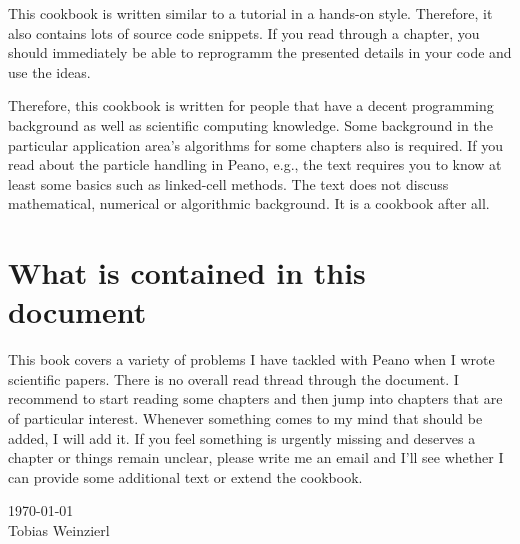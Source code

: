This cookbook is written similar to a tutorial in a hands-on style.
Therefore, it also contains lots of source code snippets.
If you read through a chapter, you should immediately be able to reprogramm the
presented details in your code and use the ideas.

Therefore, this cookbook is written for people that have a decent programming
background as well as scientific computing knowledge.
Some background in the particular application area's algorithms for some
chapters also is required. 
If you read about the particle handling in Peano, e.g., the text requires you to
know at least some basics such as linked-cell methods.
The text does not discuss mathematical, numerical or algorithmic background.
It is a cookbook after all.


\section*{What is contained in this document}

This book covers a variety of problems I have tackled with Peano when I wrote
scientific papers.
There is no overall read thread through the document.
I recommend to start reading some chapters and then jump into chapters
that are of particular interest.
Whenever something comes to my mind that should be added, I will add it.
If you feel something is urgently missing and deserves a chapter or things
remain unclear, please write me an email and I'll see whether I can provide some
additional text or extend the cookbook.


{
  \flushright
  \today 
  \\ 
  Tobias Weinzierl 
  \\
}

 